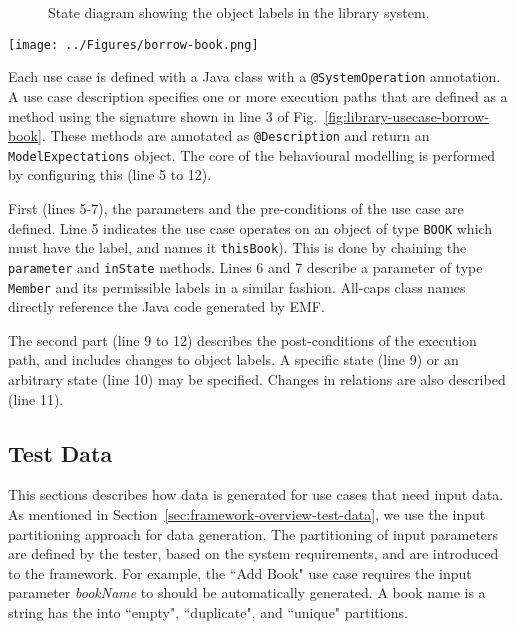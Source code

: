 \begin{figure}[h]
\centering
{}
\hfil
{}
\caption{State diagram showing the object labels in the library system.}
\label{fig:library-object-labels}
\end{figure} 

\begin{figure*}[h]
\centering
\texttt{[image: ../Figures/borrow-book.png]}
\caption{The behavioural modelling for ``Borrow Book" use case using our DSL.}
\label{fig:library-usecase-borrow-book}
\end{figure*}

Each use case is defined with a Java class with a \texttt{@SystemOperation} annotation. A use case description specifies one or more execution paths that are defined as a method using the signature shown in line 3 of Fig.~\ref{fig:library-usecase-borrow-book}. These methods are annotated as \texttt{@Description} and return an \texttt{ModelExpectations} object. The core of the behavioural modelling is performed by configuring this (line 5 to 12). 

First (lines 5-7), the parameters and the pre-conditions of the use case are defined. 
Line 5 indicates the use case operates on an object of type \texttt{BOOK} which must have the  label, and names it \texttt{thisBook}). This is done by chaining the \texttt{parameter} and \texttt{inState} methods. Lines 6 and 7 describe a parameter of type \texttt{Member} and its permissible labels in a similar fashion. All-caps class names directly reference the Java code generated by EMF. 

The second part (line 9 to 12) describes the post-conditions of the execution path, and includes changes to object labels.
A specific state (line 9) or an arbitrary state (line 10) may be specified. Changes in relations are also described (line 11). 

\subsection{Test Data}
\label{sec:create-test model-data}
This sections describes how data is generated for use cases that need input data. As mentioned in Section~\ref{sec:framework-overview-test-data}, we use the input partitioning approach for data generation. The partitioning of input parameters are defined by the tester, based on the system requirements, and are introduced to the framework. For example, the ``Add Book" use case requires the input parameter \textit{bookName} to should be automatically generated. A book name is a string has the into ``empty", ``duplicate", and ``unique" partitions.

